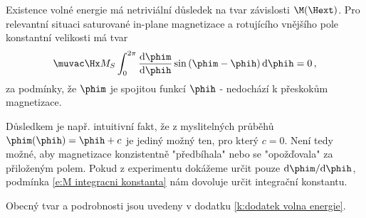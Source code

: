 Existence volné energie má netriviální důsledek na tvar závislosti $\M(\Hext)$.
Pro relevantní situaci saturované in-plane magnetizace a rotujícího vnějšího pole konstantní velikosti má tvar
\begin{equation} \label{e:M integracni konstanta}
\muvac\Hx M_S \int_{0}^{2\pi}  \frac{\text{d}\phim}{\text{d}\phih} \sin\left(\phim-\phih\right) \text{d}\phih=0 \,,
\end{equation}
za podmínky, že $\phim$ je spojitou funkcí $\phih$ - nedochází k přeskokům magnetizace.

Důsledkem je např. intuitivní fakt, že z myslitelných průběhů $\phim(\phih)=\phih+c$ je jediný možný ten, pro který $c=0$.
Není tedy možné, aby magnetizace konzistentně "předbíhala" nebo se "opožďovala" za přiloženým polem.
Pokud z experimentu dokážeme určit pouze $\text{d}\phim/\text{d}\phih$, podmínka \eqref{e:M integracni konstanta} nám dovoluje určit integrační konstantu.

Obecný tvar a podrobnosti jsou uvedeny v dodatku \ref{k:dodatek volna energie}.
